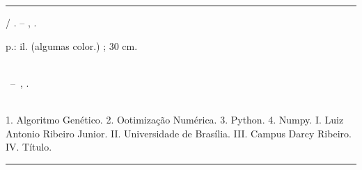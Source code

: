 \begin{fichacatalografica}
	\vspace*{\fill}										%
	\hrule														%
	\begin{center}										%
		\begin{minipage}[c]{12.5cm}			%
			
			\imprimirautor
			
			\hspace{0.5cm} \imprimirtitulo  / \imprimirautor. --
			\imprimirlocal, \imprimirdata.
			
			\hspace{0.5cm} \pageref{LastPage} p.: il. (algumas color.) ; 30 cm.\\
			
			\hspace{0.5cm} \imprimirorientadorRotulo~\imprimirorientador\\
			
			\hspace{0.5cm}
			\parbox[t]{\textwidth}{\imprimirtipotrabalho~--~\imprimirinstituicao,
				\imprimirdata.}\\
			
			\hspace{0.5cm}
			1. Algoritmo Genético.
			2. Ootimização Numérica.
			3. Python.
			4. Numpy.
			I. Luiz Antonio Ribeiro Junior.
			II. Universidade de Brasília.
			III. Campus Darcy Ribeiro.
			IV. Título.\\ 			
			
			
		\end{minipage}
	\end{center}
	\hrule
\end{fichacatalografica}